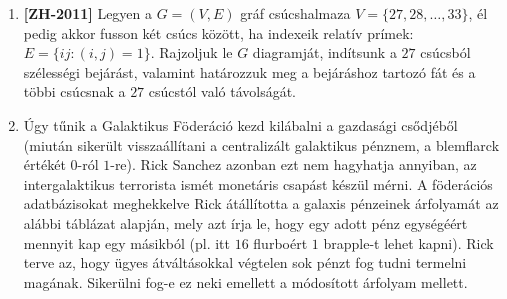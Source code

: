 \documentclass[a4paper,12pt]{article}
\begin{document}
\begin{enumerate}
        \item \label{feladat:zh2011} \textbf{[ZH-2011]} Legyen a $G=(V, E)$ gráf csúcshalmaza $V = \{27,28,\ldots,33\}$, él pedig akkor fusson két csúcs között, ha indexeik relatív prímek: $E = \{ij:(i,j) = 1\}$. Rajzoljuk le $G$ diagramját, indítsunk a $27$ csúcsból szélességi bejárást, valamint határozzuk meg a bejáráshoz tartozó fát és a többi csúcsnak a $27$ csúcstól való távolságát.

        

        \item Úgy tűnik a Galaktikus Föderáció kezd kilábalni a gazdasági csődjéből (miután sikerült visszaállítani a centralizált galaktikus pénznem, a blemflarck értékét $0$-ról $1$-re). Rick Sanchez azonban ezt nem hagyhatja annyiban, az intergalaktikus terrorista ismét monetáris csapást készül mérni. A föderációs adatbázisokat meghekkelve Rick átállította a galaxis pénzeinek árfolyamát az alábbi táblázat alapján, mely azt írja le, hogy egy adott pénz egységéért mennyit kap egy másikból (pl. itt $16$ flurboért $1$ brapple-t lehet kapni). Rick terve az, hogy ügyes átváltásokkal végtelen sok pénzt fog tudni termelni magának. Sikerülni fog-e ez neki emellett a módosított árfolyam mellett.


\end{enumerate}
\end{document}
